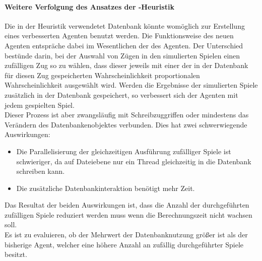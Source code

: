 \paragraph{Weitere Verfolgung des Ansatzes der -Heuristik}
Die in der  Heuristik verwendetet Datenbank könnte womöglich zur Erstellung eines verbesserten Agenten benutzt werden. Die Funktionsweise des neuen Agenten entspräche dabei im Wesentlichen der des \mxZitat{\mc} Agenten. Der Unterschied bestünde darin, bei der Auswahl von Zügen in den simulierten Spielen einen zufälligen Zug so zu wählen, dass dieser jeweils mit einer der in der Datenbank für diesen Zug gespeicherten Wahrscheinlichkeit proportionalen Wahrscheinlichkeit ausgewählt wird. Werden die Ergebnisse der simulierten Spiele zusätzlich in der Datenbank gespeichert, so verbessert sich der Agenten mit jedem gespielten Spiel.
\\Dieser Prozess ist aber zwangsläufig mit Schreibzuggriffen oder mindestens das Verändern des Datenbankenobjektes verbunden. Dies hat zwei schwerwiegende Auswirkungen:
\begin{itemize}
\item Die Parallelisierung der gleichzeitigen Ausführung zufälliger Spiele ist schwieriger, da auf Dateiebene nur ein Thread gleichzeitig in die Datenbank schreiben kann.
\item Die zusätzliche Datenbankinteraktion benötigt mehr Zeit.
\end{itemize}
Das Resultat der beiden Auswirkungen ist, dass die Anzahl der durchgeführten zufälligen Spiele reduziert werden muss wenn die Berechnungszeit nicht wachsen soll.
\\Es ist zu evaluieren, ob der Mehrwert der Datenbanknutzung größer ist als der bisherige \mxZitat{\mc} Agent, welcher eine höhere Anzahl an zufällig durchgeführter Spiele besitzt.


